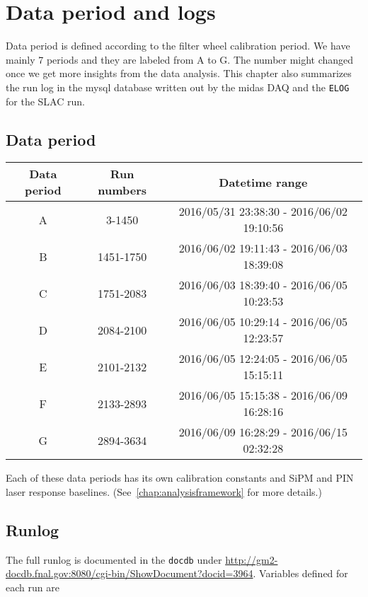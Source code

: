 \chapter{Data period and logs}
\label{chap:runlog}

Data period is defined according to the filter wheel calibration period. We have mainly 7 periods and they are labeled from A to G.  The number might changed once we get more insights from the data analysis. This chapter also summarizes the run log in the mysql database written out by the \ac{midas} DAQ and the \verb+ELOG+ for the SLAC run.

\section{Data period}

\begin{table}[htbp]
\caption{Summary of the data period. Included are the range of the run numbers and the date-time.}
\begin{longtable}{|c|c|c|} \hline
Data period &  Run numbers & Datetime range \\ \hline
A & 3-1450 & 2016/05/31 23:38:30 - 2016/06/02 19:10:56 \\ \hline
B & 1451-1750 & 2016/06/02 19:11:43  - 2016/06/03 18:39:08 \\ \hline
C & 1751-2083 & 2016/06/03 18:39:40 - 2016/06/05 10:23:53 \\ \hline
D & 2084-2100 & 2016/06/05 10:29:14 - 2016/06/05 12:23:57 \\ \hline
E & 2101-2132 & 2016/06/05 12:24:05 - 2016/06/05 15:15:11 \\ \hline
F & 2133-2893 & 2016/06/05 15:15:38 - 2016/06/09 16:28:16 \\ \hline
G & 2894-3634 & 2016/06/09 16:28:29 - 2016/06/15 02:32:28 \\ \hline
\end{longtable}
\end{table}

Each of these data periods has its own calibration constants and SiPM and PIN laser response baselines.
(See~\cref{chap:analysisframework} for more details.)

\section{Runlog}

The full runlog is documented in the \verb+docdb+ under \url{http://gm2-docdb.fnal.gov:8080/cgi-bin/ShowDocument?docid=3964}.
Variables defined for each run are

